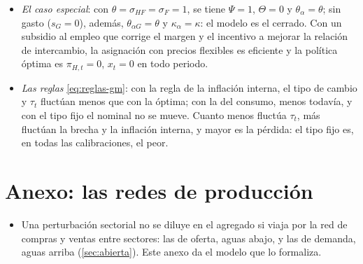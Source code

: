 \documentclass[11pt]{article}
\begin{document}
\begin{itemize}
\begin{itemize}
  \item \emph{El caso especial}: con $\theta=\sigma_{HF}=\sigma_F=1$, se tiene $\Psi=1$, $\Theta=0$ y $\theta_{\alpha}=\theta$; sin gasto ($s_G=0$), además, $\theta_{\alpha G}=\theta$ y $\kappa_{\alpha}=\kappa$: el modelo es el cerrado. Con un subsidio al empleo que corrige el margen y el incentivo a mejorar la relación de intercambio, la asignación con precios flexibles es eficiente y la política óptima es $\pi_{H,t}=0$, $x_t=0$ en todo periodo\nocite{GaliMonacelli2005Monetary}.
  \item \emph{Las reglas} \eqref{eq:reglas-gm}: con la regla de la inflación interna, el tipo de cambio y $\tau_t$ fluctúan menos que con la óptima; con la del consumo, menos todavía, y con el tipo fijo el nominal no se mueve. Cuanto menos fluctúa $\tau_t$, más fluctúan la brecha y la inflación interna, y mayor es la pérdida: el tipo fijo es, en todas las calibraciones, el peor\nocite{GaliMonacelli2005Monetary}.
  \end{itemize}
\end{itemize}
\findemo

\section{Anexo: las redes de producción}\label{anexo:redes}

\begin{itemize}
\item Una perturbación sectorial no se diluye en el agregado si viaja por la red de compras y ventas entre sectores: las de oferta, aguas abajo, y las de demanda, aguas arriba (\ref{sec:abierta}). Este anexo da el modelo que lo formaliza.
\end{itemize}
\end{document}
